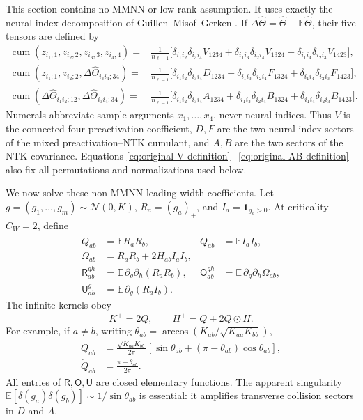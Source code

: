 \documentclass{article}
\newcommand{\E}{\mathbb E}
\newcommand{\cum}{\operatorname{cum}}
\newcommand{\ind}{\mathbf 1}
\begin{document}
This section contains no MMNN or low-rank assumption.  It uses exactly the
neural-index decomposition of Guillen--Misof--Gerken
\citep{FeynmanNTK2026}.  If
\(\Delta\widehat\Theta=\widehat\Theta-\E\widehat\Theta\), their five tensors
are defined by
\begin{align}
\cum(z_{i_1;1},z_{i_2;2},z_{i_3;3},z_{i_4;4})
={}&\frac1{n_{\ell-1}}\big[
\delta_{i_1i_2}\delta_{i_3i_4}V_{1234}
+\delta_{i_1i_3}\delta_{i_2i_4}V_{1324}
+\delta_{i_1i_4}\delta_{i_2i_3}V_{1423}\big],
\label{eq:original-V-definition}\\
\cum(z_{i_1;1},z_{i_2;2},\Delta\widehat\Theta_{i_3i_4;34})
={}&\frac1{n_{\ell-1}}\big[
\delta_{i_1i_2}\delta_{i_3i_4}D_{1234}
+\delta_{i_1i_3}\delta_{i_2i_4}F_{1324}
+\delta_{i_1i_4}\delta_{i_2i_3}F_{1423}\big],
\label{eq:original-DF-definition}\\
\cum(\Delta\widehat\Theta_{i_1i_2;12},
\Delta\widehat\Theta_{i_3i_4;34})
={}&\frac1{n_{\ell-1}}\big[
\delta_{i_1i_2}\delta_{i_3i_4}A_{1234}
+\delta_{i_1i_3}\delta_{i_2i_4}B_{1324}
+\delta_{i_1i_4}\delta_{i_2i_3}B_{1423}\big].
\label{eq:original-AB-definition}
\end{align}
Numerals abbreviate sample arguments \(x_1,\ldots,x_4\), never neural
indices.  Thus \(V\) is the connected four-preactivation coefficient,
\(D,F\) are the two neural-index sectors of the mixed
preactivation--NTK cumulant, and \(A,B\) are the two sectors of the NTK
covariance.  Equations \eqref{eq:original-V-definition}--
\eqref{eq:original-AB-definition} also fix all permutations and
normalizations used below.

We now solve these non-MMNN leading-width coefficients.  Let
\(g=(g_1,\ldots,g_m)\sim\mathcal N(0,K)\),
\(R_a=(g_a)_+\), and \(I_a=\ind_{g_a>0}\).  At criticality
\(C_W=2\), define
\begin{align}
Q_{ab}&=\E R_aR_b,& \dot Q_{ab}&=\E I_aI_b,\\
\Omega_{ab}&=R_aR_b+2H_{ab}I_aI_b,\\
\mathsf R_{ab}^{gh}&=\E\,\partial_g\partial_h(R_aR_b),&
\mathsf O_{ab}^{gh}&=\E\,\partial_g\partial_h\Omega_{ab},\\
\mathsf U_{ab}^{g}&=\E\,\partial_g(R_aI_b).
\end{align}
The infinite kernels obey
\begin{equation}
K^+=2Q,\qquad H^+=Q+2\dot Q\odot H.
\label{eq:KH-recursion}
\end{equation}
For example, if \(a\ne b\), writing
\(\theta_{ab}=\arccos(K_{ab}/\sqrt{K_{aa}K_{bb}})\),
\begin{align}
Q_{ab}&=\frac{\sqrt{K_{aa}K_{bb}}}{2\pi}
[\sin\theta_{ab}+(\pi-\theta_{ab})\cos\theta_{ab}],\label{eq:relu-Q}\\
\dot Q_{ab}&=\frac{\pi-\theta_{ab}}{2\pi}.\label{eq:relu-Qdot}
\end{align}
All entries of \(\mathsf R,\mathsf O,\mathsf U\) are closed elementary
functions.  The apparent singularity
\(\E[\delta(g_a)\delta(g_b)]\sim1/\sin\theta_{ab}\) is essential: it
amplifies transverse collision sectors in \(D\) and \(A\).
\end{document}

